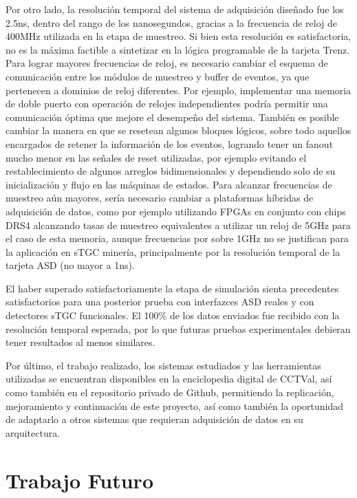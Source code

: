 Por otro lado, la resolución temporal del sistema de adquisición diseñado fue los 2.5ns, dentro del rango de los nanosegundos, gracias a la frecuencia de reloj de 400MHz utilizada en la etapa de muestreo. Si bien esta resolución es satisfactoria, no es la máxima factible a sintetizar en la lógica programable de la tarjeta Trenz. Para lograr mayores frecuencias de reloj, es necesario cambiar el esquema de comunicación entre los módulos de muestreo y buffer de eventos, ya que pertenecen a dominios de reloj diferentes. Por ejemplo, implementar una memoria de doble puerto con operación de relojes independientes podría permitir una comunicación óptima que mejore el desempeño del sistema. También es posible cambiar la manera en que se resetean algunos bloques lógicos, sobre todo aquellos encargados de retener la información de los eventos, logrando tener un fanout mucho menor en las señales de reset utilizadas, por ejemplo evitando el restablecimiento de algunos arreglos bidimensionales y dependiendo solo de su inicialización y flujo en las máquinas de estados. Para alcanzar frecuencias de muestreo aún mayores, sería necesario cambiar a plataformas híbridas de adquisición de datos, como por ejemplo utilizando FPGAs en conjunto con chips DRS4\cite{RittDRS4Array} alcanzando tasas de muestreo equivalentes a utilizar un reloj de 5GHz para el caso de esta memoria, aunque frecuencias por sobre 1GHz no se justifican para la aplicación en sTGC minería, principalmente por la resolución temporal de la tarjeta ASD (no mayor a 1ns).

El haber superado satisfactoriamente la etapa de simulación sienta precedentes satisfactorios para una posterior prueba con interfazces ASD reales y con detectores sTGC funcionales. El 100\% de los datos enviados fue recibido con la resolución temporal esperada, por lo que futuras pruebas experimentales debieran tener resultados al menos similares.

Por último, el trabajo realizado, los sistemas estudiados y las herramientas utilizadas se encuentran disponibles en la enciclopedia digital de CCTVal, así como también en el repositorio privado de Github, permitiendo la replicación, mejoramiento y continuación de este proyecto, así como también la oportunidad de adaptarlo a otros sistemas que requieran adquisición de datos en su arquitectura.


\section{Trabajo Futuro}

